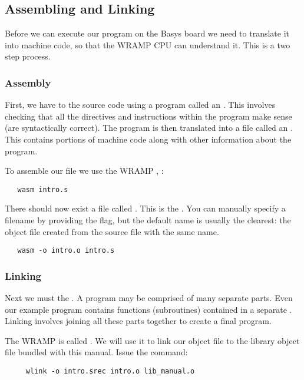 \subsection{Assembling and Linking}
Before we can execute our program on the Basys board we need to translate it 
into machine code, so that the WRAMP CPU can understand it. This is a two
step process.

\subsubsection{Assembly}
First, we have to  the source code using a program
called an . This involves checking that all the
directives and instructions within the program make sense (are
syntactically correct). The program is then translated into a file
called an . This contains portions of machine code
along with other information about the program.

To assemble our file we use the WRAMP , :
\begin{verbatim}
   wasm intro.s
\end{verbatim}

There should now exist a file called . This is the 
. You can manually specify a filename by providing the
 flag, but the default name is usually the clearest: the
object file created from the source file with the same name.

\begin{verbatim}
   wasm -o intro.o intro.s
\end{verbatim}

\subsubsection{Linking}
Next we must  the . A program may be
comprised of many separate parts. Even our example program contains
functions (subroutines) contained in a separate . Linking
involves joining all these parts together to create a final program.

The WRAMP  is called . We will use it to
link our object file to the library object file bundled with this manual.
Issue the command:
\begin{verbatim}
     wlink -o intro.srec intro.o lib_manual.o
\end{verbatim}

